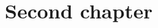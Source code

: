\documentclass[../phdthesis]{subfiles}
\begin{document}
\chapter{Second chapter}
\label{chapter2}

\ifSubfilesClassLoaded{
	\printbibliography
}{}
\end{document}
